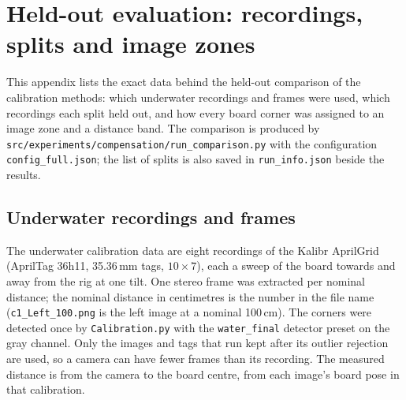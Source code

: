 
\chapter{Held-out evaluation: recordings, splits and image zones}
\label{app:heldout}

This appendix lists the exact data behind the held-out comparison of the calibration methods: which underwater
recordings and frames were used, which recordings each split held out, and how every board corner was assigned
to an image zone and a distance band. The comparison is produced by
\texttt{src/experiments/compensation/run\_comparison.py} with the configuration \texttt{config\_full.json};
the list of splits is also saved in \texttt{run\_info.json} beside the results.

\section{Underwater recordings and frames}
\label{app:heldout:recordings}

The underwater calibration data are eight recordings of the Kalibr AprilGrid (AprilTag 36h11, 35.36\,mm tags,
$10\times7$), each a sweep of the board towards and away from the rig at one tilt. One stereo frame was extracted
per nominal distance; the nominal distance in centimetres is the number in the file name
(\texttt{c1\_Left\_100.png} is the left image at a nominal 100\,cm). The corners were detected once by
\texttt{Calibration.py} with the \texttt{water\_final} detector preset on the gray channel. Only the images and
tags that run kept after its outlier rejection are used, so a camera can have fewer frames than its recording.
The measured distance is from the camera to the board centre, from each image's board pose in that calibration.

